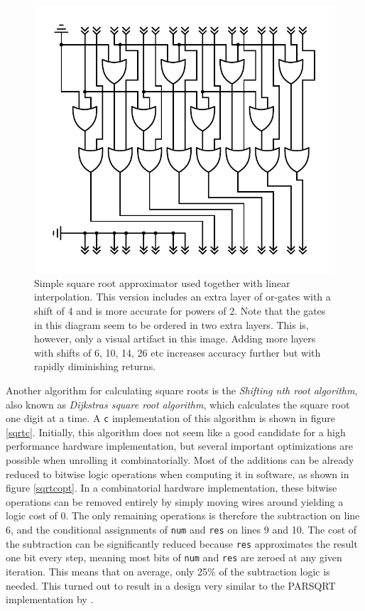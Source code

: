 			\begin{figure}
				\centering
				\caption{ Simple square root approximator used together with
					linear interpolation. This version includes an extra layer
					of or-gates with a shift of 4 and is more accurate for
					powers of 2. Note that the gates in this diagram seem to be
					ordered in two extra layers. This is, however, only a
					visual artifact in this image. Adding more layers with
					shifts of 6, 10, 14, 26 etc increases accuracy further but 
					with rapidly diminishing returns.}
				\label{orsqrt3}
				\includegraphics[width=0.75\linewidth]{figure/pdf/sqrt2Or.pdf} 
			\end{figure}

			Another algorithm for calculating square roots is the
			\emph{Shifting nth root algorithm}, also known as \emph{Dijkstras
			square root algorithm}, which calculates the square root one digit
			at a time. A \texttt{c} implementation of this algorithm is shown
			in figure \ref{sqrtc}. Initially, this algorithm does not seem like
			a good candidate for a high performance hardware implementation,
			but several important optimizations are possible when unrolling it
			combinatorially. Most of the additions can be already reduced to bitwise
			logic operations when computing it in software, as shown in
			figure \ref{sqrtcopt}. In a combinatorial hardware implementation,
			these bitwise operations can be removed entirely by simply moving
			wires around yielding a logic cost of 0. The only remaining
			operations is therefore the subtraction on line 6, and the
			conditional assignments of \texttt{num} and \texttt{res} on lines 9
			and 10. The cost of the subtraction can be significantly reduced
			because \texttt{res} approximates the result one bit every step,
			meaning most bits of \texttt{num} and \texttt{res} are zeroed at
			any given iteration. This means that on average, only 25\% of the
			subtraction logic is needed. This turned out to result in a design
			very similar to the PARSQRT implementation by \cite{Li}.

